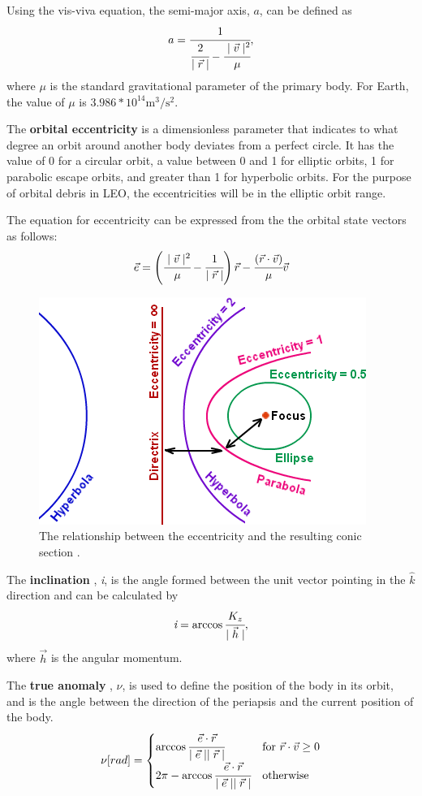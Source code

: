 \documentclass[a4paper, 12pt]{article}
\newcommand{\lindex}[1]{%
	\lowercase{\def\temp{#1}}%
	\expandafter\index\expandafter{\temp}%
}
\newcommand{\boldindex}[1]{%
	\textbf{#1}\lindex{#1}%
}
\begin{document}
Using the vis-viva equation, the semi-major axis, $a$, can be defined as
\begin{equation}
a = \cfrac{1}{\cfrac{2}{\mid \vec{r} \mid} - \cfrac{\mid \vec{v} \mid^2 }{\mu}},
\end{equation}
\noindent where $\mu$ is the standard gravitational parameter of the primary body. For Earth, the value of $\mu$ is $3.986 *10^{14}\text{m}^3/\text{s}^2$.

The \boldindex{orbital eccentricity} is a dimensionless parameter that indicates to what degree an orbit around another body deviates from a perfect circle. It has the value of 0 for a circular orbit, a value between 0 and 1 for elliptic orbits, 1 for parabolic escape orbits, and greater than 1 for hyperbolic orbits. For the purpose of orbital debris in LEO, the eccentricities will be in the elliptic orbit range.

The equation for eccentricity can be expressed from the the orbital state vectors as follows:
\begin{equation}
\vec{e} = \left(\cfrac{\mid \vec{v} \mid^2}{\mu} - \cfrac{1}{\mid \vec{r} \mid}\right)\vec{r} - \cfrac{(\vec{r} \cdot \vec{v})}{\mu}\vec{v}
\end{equation}

\begin{figure}[h]
	\centering
	\includegraphics[width=0.5\linewidth]{eccentricity}
	\caption{The relationship between the eccentricity and the resulting conic section \cite{noauthor_astrodynamicsclassical_nodate}.}
\end{figure}

The \boldindex{inclination}, \textit{i}, is the angle formed between the unit vector pointing in the $\hat{k}$ direction and can be calculated by
\begin{equation}
\textit{i} =  \arccos \cfrac{K_z}{\mid \vec{h} \mid},
\end{equation}
where $\vec{h}$ is the angular momentum.

The \boldindex{true anomaly}, $\nu$, is used to define the position of the body in its orbit, and is the angle between the direction of the periapsis and the current position of the body.
\begin{equation}
	\nu [rad] = \begin{cases}
		\arccos \cfrac{\vec{e} \cdot \vec{r}}{\mid \vec{e} \mid \mid \vec{r} \mid} & \text{for } \vec{r} \cdot \vec{v} \geq 0 \\
		2\pi - \arccos \cfrac{\vec{e} \cdot \vec{r}}{\mid \vec{e} \mid \mid \vec{r} \mid}& \text{otherwise}	
	\end{cases}
\end{equation}
\end{document}
